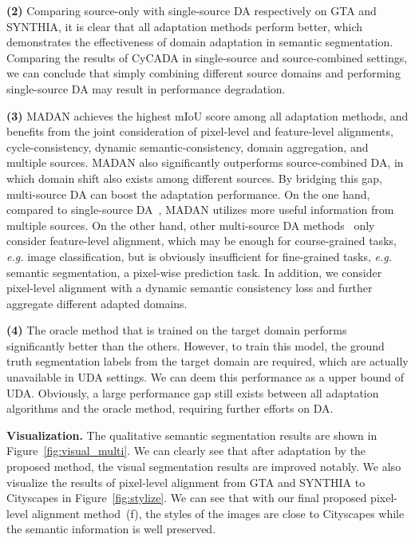 \documentclass{article}
\begin{document}
\textbf{(2)} Comparing source-only with single-source DA respectively on GTA and SYNTHIA, it is clear that all adaptation methods perform better, which demonstrates the effectiveness of domain adaptation in semantic segmentation. Comparing the results of CyCADA in single-source and source-combined settings, we can conclude that simply combining different source domains and performing single-source DA may result in performance degradation.

\textbf{(3)} MADAN achieves the highest mIoU score among all adaptation methods, and benefits from the joint consideration of pixel-level and feature-level alignments, cycle-consistency, dynamic semantic-consistency, domain aggregation, and multiple sources.
MADAN also significantly outperforms source-combined DA, in which domain shift also exists among different sources. By bridging this gap, multi-source DA can boost the adaptation performance.
On the one hand, compared to single-source DA~\cite{hoffman2016fcns,zhang2017curriculum,chen2018road,tsai2018learning,hoffman2018cycada,wu2018dcan}, MADAN utilizes more useful information from multiple sources. On the other hand, other multi-source DA methods~\cite{xu2018deep,zhao2018adversarial,peng2018moment} only consider feature-level alignment, which may be enough for course-grained tasks, \textit{e.g.} image classification, but is obviously insufficient for fine-grained tasks, \textit{e.g.} semantic segmentation, a pixel-wise prediction task. In addition, we consider pixel-level alignment with a dynamic semantic consistency loss and further aggregate different adapted domains.

\textbf{(4)} The oracle method that is trained on the target domain performs significantly better than the others. However, to train this model, the ground truth segmentation labels from the target domain are required, which are actually unavailable in UDA settings. We can deem this performance as a upper bound of UDA. Obviously, a large performance gap still exists between all adaptation algorithms and the oracle method, requiring further efforts on DA.







\textbf{Visualization.} The qualitative semantic segmentation results are shown in Figure~\ref{fig:visual_multi}. We can clearly see that after adaptation by the proposed method, the visual segmentation results are improved notably.
We also visualize the results of pixel-level alignment from GTA and SYNTHIA to Cityscapes in Figure~\ref{fig:stylize}. We can see that with our final proposed pixel-level alignment method~(f), the styles of the images are close to Cityscapes while the semantic information is well preserved.
\end{document}
